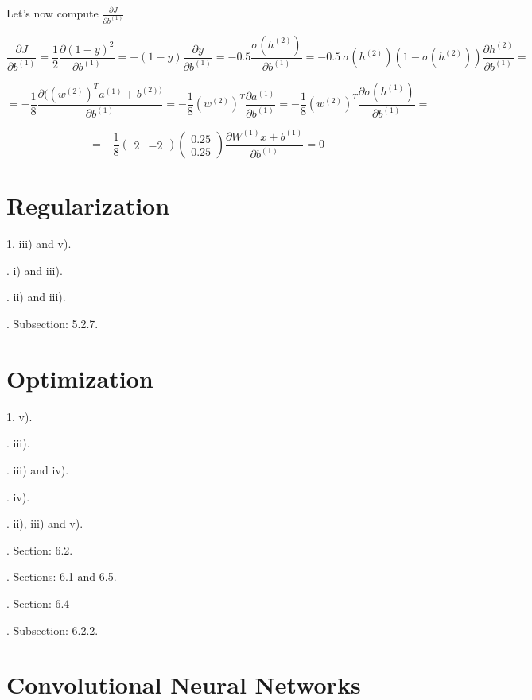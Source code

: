 \noindent Let's now compute $\frac{\partial J}{\partial b^{(1)}}$

$$ \frac{\partial J}{\partial b^{(1)}} = \frac{1}{2} \frac{\partial (1 - y)^2}{\partial b^{(1)}} = 
-(1 - y) \frac{\partial y}{\partial b^{(1)}} = -0.5 \frac{\sigma(h^{(2)})}{\partial b^{(1)}} = -0.5~  \sigma(h^{(2)}) (1 - \sigma(h^{(2)})) \frac{ \partial h^{(2)} }{\partial b^{(1)}} =  $$

$$ = -\frac{1}{8} \frac{\partial ( (w^{(2)})^T a^{(1)} + b^{(2) ) }}{\partial b^{(1)}} =  -\frac{1}{8}(w^{(2)})^T \frac{\partial a^{(1)}}{\partial b^{(1)}} = -\frac{1}{8}(w^{(2)})^T \frac{\partial \sigma (h^{(1)})}{\partial b^{(1)}} =  $$

$$ = -\frac{1}{8} \begin{pmatrix}  2 & -2 \end{pmatrix} \begin{pmatrix} 0.25 \\ 0.25 \end{pmatrix}  \frac{\partial W^{(1)}x + b^{(1)}}{\partial b^{(1)}} = 0 $$



\section{Regularization}

1. iii) and v).

. i) and iii).

. ii) and iii).

. Subsection: 5.2.7.

\section{Optimization}

1. v).

. iii).

. iii) and iv).

. iv).

. ii), iii) and v).

. Section: 6.2.

. Sections: 6.1 and 6.5.

. Section: 6.4

. Subsection: 6.2.2. 

\section{Convolutional Neural Networks}

